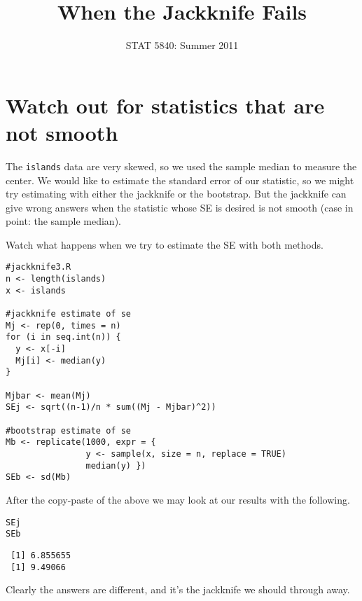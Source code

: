 \documentclass[11pt,english]{article}
\title{When the Jackknife Fails}
\date{STAT 5840: Summer 2011}
\begin{document}
\maketitle

\thispagestyle{empty}

\section*{Watch out for statistics that are not smooth}
\label{sec-1}

The \texttt{islands} data are very skewed, so we used the sample median to measure the center.  We would like to estimate the standard error of our statistic, so we might try estimating with either the jackknife or the bootstrap.  But the jackknife can give wrong answers when the statistic whose SE is desired is not smooth (case in point: the sample median).

Watch what happens when we try to estimate the SE with both methods.
\begin{verbatim}
#jackknife3.R
n <- length(islands)
x <- islands

#jackknife estimate of se
Mj <- rep(0, times = n)
for (i in seq.int(n)) {  
  y <- x[-i]
  Mj[i] <- median(y)
}

Mjbar <- mean(Mj)
SEj <- sqrt((n-1)/n * sum((Mj - Mjbar)^2))

#bootstrap estimate of se
Mb <- replicate(1000, expr = {
                y <- sample(x, size = n, replace = TRUE)
                median(y) })
SEb <- sd(Mb)
\end{verbatim}



After the copy-paste of the above we may look at our results with the following.
\begin{verbatim}
SEj
SEb
\end{verbatim}

\begin{verbatim}
 [1] 6.855655
 [1] 9.49066
\end{verbatim}


Clearly the answers are different, and it's the jackknife we should through away.
\end{document}
